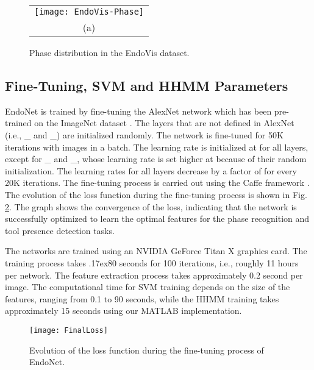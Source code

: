 \documentclass[journal]{IEEEtran} \usepackage{amssymb}
\newcommand{\mytilde}{\raise.17ex\hbox{}}
\begin{document}
\begin{figure}
\begin{centering}
\begin{tabular}{c}
\texttt{[image: EndoVis-Phase]}\tabularnewline
{\scriptsize (a)}\tabularnewline
\end{tabular}
\par\end{centering}

\caption{Phase distribution in the EndoVis dataset. \label{fig:EndoVis-statistics.}}


\end{figure}

\subsection{Fine-Tuning, SVM and HHMM Parameters}

EndoNet is trained by fine-tuning the AlexNet network \cite{krizhevsky_nips2012} which has been pre-trained on the ImageNet dataset \cite{imagenet}. The layers that are not defined in AlexNet (i.e., \_ and \_) are initialized randomly. 
The network is fine-tuned for 50K iterations with  images in a batch.
The learning rate is initialized at  for all layers, except
for \_ and \_,
whose learning rate is set higher at  because of their random initialization. The learning rates for all layers decrease by a factor of
 for every 20K iterations. The fine-tuning process is carried
out using the Caffe framework \cite{caffe}. The evolution of the loss function  during the fine-tuning process
is shown in Fig. \ref{fig:The-evolution-of}. The graph shows the
convergence of the loss, indicating that the network is successfully optimized
to learn the optimal features for the phase recognition and tool presence
detection tasks.

The networks are trained using an NVIDIA GeForce Titan X graphics card. The training process takes \mytilde{80} seconds for 100 iterations, i.e., roughly 11 hours per network. The feature extraction process takes approximately 0.2 second per image. The computational time for SVM training depends on the size of the features, ranging from 0.1 to 90 seconds, while the HHMM training takes approximately 15 seconds using our MATLAB implementation.

\begin{figure}
\begin{centering}
\texttt{[image: FinalLoss]}
\par\end{centering}

\caption{Evolution of the loss function during the fine-tuning process of EndoNet. \label{fig:The-evolution-of}}
\end{figure}
\end{document}
